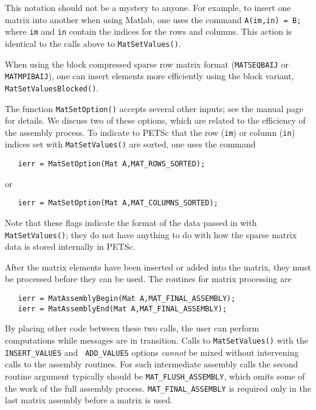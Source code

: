 This notation should not be a mystery to anyone. For example, 
to insert one matrix into another when using Matlab, one uses the command 
{\tt A(im,in) = B;} where {\tt im} and {\tt in} contain the indices for the
rows and columns. This action is identical to the calls above to 
{\tt MatSetValues()}.

When using the block compressed sparse row matrix format ({\tt MATSEQBAIJ} or
{\tt MATMPIBAIJ}), one can insert elements more efficiently using the block
variant, {\tt MatSetValuesBlocked()}. 

The function {\tt MatSetOption()} accepts several other inputs; see
the manual page for details. We
discuss two of these options, which are related to the efficiency of the
assembly process.  To indicate to PETSc that the row ({\tt im}) or
column ({\tt in}) indices set with {\tt MatSetValues()} are sorted,
one uses the command  
\begin{verbatim}
   ierr = MatSetOption(Mat A,MAT_ROWS_SORTED);
\end{verbatim}
or 
\begin{verbatim}
   ierr = MatSetOption(Mat A,MAT_COLUMNS_SORTED);
\end{verbatim}
Note that these flags indicate the format of the data passed in with 
{\tt MatSetValues()}; they do not have anything to do with how the sparse
matrix data is stored internally in PETSc.

After the matrix elements have been inserted or added into the matrix, 
they must be processed before they can be used. The routines for matrix
processing are  
\begin{verbatim}
   ierr = MatAssemblyBegin(Mat A,MAT_FINAL_ASSEMBLY);
   ierr = MatAssemblyEnd(Mat A,MAT_FINAL_ASSEMBLY);
\end{verbatim}
By placing other code between these two calls, the user can perform
computations while messages are in transition.
Calls to {\tt MatSetValues()} with the {\tt INSERT\_VALUES} and {\tt
ADD\_VALUES} options {\em cannot} be mixed without intervening calls to
the assembly routines.  For such intermediate assembly calls the
second routine argument  typically should be {\tt MAT\_FLUSH\_ASSEMBLY},
 which omits some of the work of the full 
assembly process.  {\tt MAT\_FINAL\_ASSEMBLY}  is
required only in the last matrix assembly before a matrix is used.

